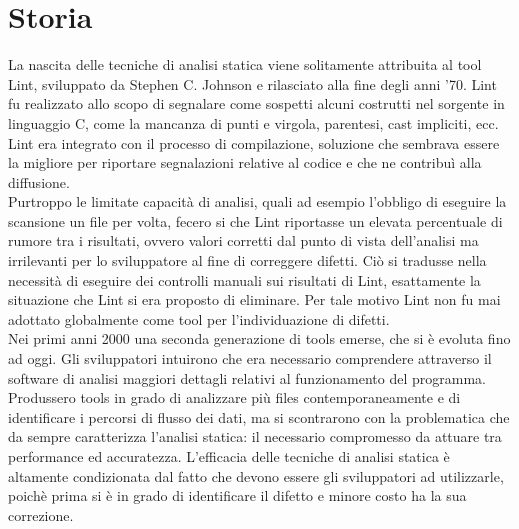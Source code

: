 \section{Storia}
La nascita delle tecniche di analisi statica viene solitamente attribuita al tool Lint, sviluppato da Stephen C. Johnson e rilasciato alla fine degli anni '70. Lint fu realizzato allo scopo di segnalare come sospetti alcuni costrutti nel sorgente in linguaggio C, come la mancanza di punti e virgola, parentesi, cast impliciti, ecc. 
Lint era integrato con il processo di compilazione, soluzione che sembrava essere la migliore per riportare segnalazioni relative al codice e che ne contribuì alla diffusione.\\
Purtroppo le limitate capacità di analisi, quali ad esempio l'obbligo di eseguire la scansione un file per volta, fecero si che Lint riportasse un elevata percentuale di rumore tra i risultati, ovvero valori corretti dal punto di vista dell'analisi ma irrilevanti per lo sviluppatore al fine di correggere difetti. Ciò si tradusse nella necessità di eseguire dei controlli manuali sui risultati di Lint, esattamente la situazione che Lint si era proposto di eliminare.
Per tale motivo Lint non fu mai adottato globalmente come tool per l'individuazione di difetti.\\
Nei primi anni 2000 una seconda generazione di tools emerse, che si è evoluta fino ad oggi. Gli sviluppatori intuirono che era necessario comprendere attraverso il software di analisi maggiori dettagli relativi al funzionamento del programma. Produssero tools in grado di  analizzare più files contemporaneamente e di identificare i percorsi di flusso dei dati, ma si scontrarono con la problematica che da sempre caratterizza l'analisi statica: il necessario compromesso da attuare tra performance ed accuratezza. L'efficacia delle tecniche di analisi statica è altamente condizionata dal fatto che devono essere gli sviluppatori ad utilizzarle, poichè prima si è in grado di identificare il difetto e minore costo ha la sua correzione.

